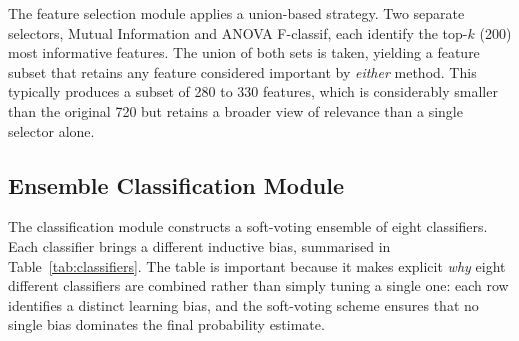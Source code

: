 The feature selection module applies a union-based strategy. Two separate selectors, Mutual Information and ANOVA F-classif, each identify the top-$k$ (200) most informative features. The union of both sets is taken, yielding a feature subset that retains any feature considered important by \textit{either} method. This typically produces a subset of 280 to 330 features, which is considerably smaller than the original 720 but retains a broader view of relevance than a single selector alone.

\subsection{Ensemble Classification Module}

The classification module constructs a soft-voting ensemble of eight classifiers. Each classifier brings a different inductive bias, summarised in Table~\ref{tab:classifiers}. The table is important because it makes explicit \textit{why} eight different classifiers are combined rather than simply tuning a single one: each row identifies a distinct learning bias, and the soft-voting scheme ensures that no single bias dominates the final probability estimate.

\begin{table}[htbp]
\centering
\renewcommand{\arraystretch}{1.3}
\caption{Eight Classifiers in the Ensemble.}
\label{tab:classifiers}
\end{table}

